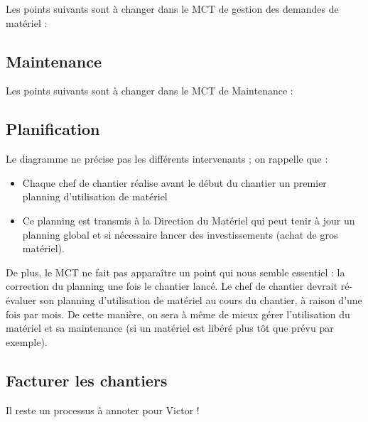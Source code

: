 \documentclass[a4paper]{article}
\begin{document}
Les points suivants sont à changer dans le MCT de gestion des demandes de
matériel :


\subsection{Maintenance}

Les points suivants sont à changer dans le MCT de Maintenance :


\subsection{Planification}

Le diagramme ne précise pas les différents intervenants ; on rappelle que :
\begin{itemize}
\item Chaque chef de chantier réalise avant le début du chantier un premier
planning d'utilisation de matériel
\item Ce planning est transmis à la Direction du Matériel qui peut tenir à
jour un planning global et si nécessaire lancer des investissements (achat
de gros matériel).
\end{itemize}

\vskip 6pt

De plus, le MCT ne fait pas apparaître un point qui nous semble essentiel :
la correction du planning une fois le chantier lancé. Le chef de chantier
devrait ré-évaluer son planning d'utilisation de matériel au cours du
chantier, à raison d'une fois par mois. De cette manière, on sera à même de
mieux gérer l'utilisation du matériel et sa maintenance (si un matériel est
libéré plus tôt que prévu par exemple).


\subsection{Facturer les chantiers}

Il reste un processus à annoter pour Victor !
\end{document}
